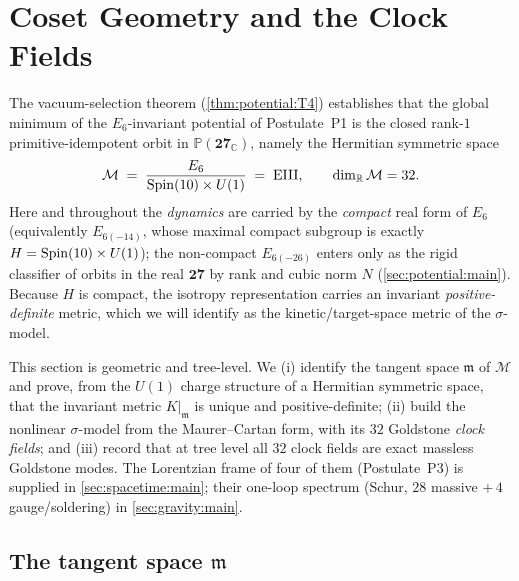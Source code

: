 \section{Coset Geometry and the Clock Fields}
\label{sec:coset:main}
\label{sec:foundations:coset}
\label{sec:sigma}
\label{sec:foundation:tangent}

The vacuum-selection theorem (\autoref{thm:potential:T4}) establishes that the
global minimum of the $E_{6}$-invariant potential of Postulate~P1 is the closed
rank-$1$ primitive-idempotent orbit in $\mathbb P(\mathbf{27}_{\mathbb C})$, namely
the Hermitian symmetric space
\begin{equation}\label{eq:coset:vacuum}
  \mathcal M \;=\; \frac{E_{6}}{\operatorname{Spin}(10)\times U(1)} \;=\; \mathrm{EIII},
  \qquad \dim_{\mathbb R}\mathcal M = 32 .
\end{equation}
Here and throughout the \emph{dynamics} are carried by the \emph{compact} real
form of $E_{6}$ (equivalently $E_{6(-14)}$, whose maximal compact subgroup is
exactly $H = \operatorname{Spin}(10)\times U(1)$); the non-compact $E_{6(-26)}$ enters only as
the rigid classifier of orbits in the real $\mathbf{27}$ by rank and cubic norm
$N$ (\autoref{sec:potential:main}). Because $H$ is compact, the isotropy
representation carries an invariant \emph{positive-definite} metric, which we
will identify as the kinetic/target-space metric of the $\sigma$-model.

This section is geometric and tree-level. We (i) identify the tangent space
$\mathfrak m$ of $\mathcal M$ and prove, from the $U(1)$ charge structure of a
Hermitian symmetric space, that the invariant metric $K|_{\mathfrak m}$ is unique
and positive-definite; (ii) build the nonlinear $\sigma$-model from the
Maurer--Cartan form, with its $32$ Goldstone \emph{clock fields}; and (iii)
record that at tree level all $32$ clock fields are exact massless Goldstone
modes. The Lorentzian frame of four of them (Postulate~P3) is supplied in
\autoref{sec:spacetime:main}; their one-loop spectrum (Schur, $28$ massive $+\,4$
gauge/soldering) in \autoref{sec:gravity:main}.

\subsection{The tangent space \texorpdfstring{$\mathfrak m$}{m}}
\label{sec:coset:tangent}

